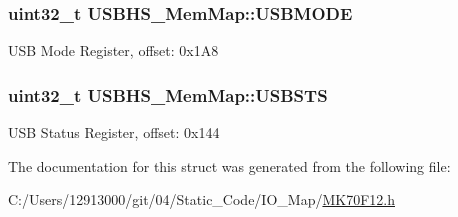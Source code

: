 \subsubsection[{U\+S\+B\+M\+O\+D\+E}]{\setlength{\rightskip}{0pt plus 5cm}uint32\+\_\+t U\+S\+B\+H\+S\+\_\+\+Mem\+Map\+::\+U\+S\+B\+M\+O\+D\+E}\label{struct_u_s_b_h_s___mem_map_afe4ec3963906653c83890dea008fac84}
U\+S\+B Mode Register, offset\+: 0x1\+A8 \hypertarget{struct_u_s_b_h_s___mem_map_ab651a6e6b81d8e4f97a9637833cc45b2}{}
\subsubsection[{U\+S\+B\+S\+T\+S}]{\setlength{\rightskip}{0pt plus 5cm}uint32\+\_\+t U\+S\+B\+H\+S\+\_\+\+Mem\+Map\+::\+U\+S\+B\+S\+T\+S}\label{struct_u_s_b_h_s___mem_map_ab651a6e6b81d8e4f97a9637833cc45b2}
U\+S\+B Status Register, offset\+: 0x144 

The documentation for this struct was generated from the following file\+:\begin{DoxyCompactItemize}
\item 
C\+:/\+Users/12913000/git/04/\+Static\+\_\+\+Code/\+I\+O\+\_\+\+Map/\hyperlink{_m_k70_f12_8h}{M\+K70\+F12.\+h}\end{DoxyCompactItemize}
